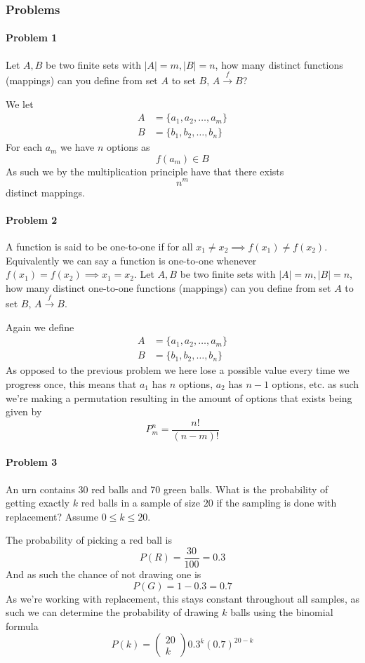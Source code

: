 \subsubsection{Problems}
\paragraph{Problem 1}
Let $A,B$ be two finite sets with $|A|=m,|B|=n$, how many distinct functions (mappings) can you define from set $A$ to set $B$, $A\xrightarrow{f} B$?

We let
\begin{align*}
    A&=\{a_{1},a_{2},\ldots,a_{m}\} \\
    B&=\{b_{1},b_{2},\ldots,b_{n}\}
\end{align*}
For each $a_{m}$ we have $n$ options as
\[
    f(a_{m})\in B
\]
As such we by the multiplication principle have that there exists
\[
    n^{m}
\]
distinct mappings.
\paragraph{Problem 2}
A function is said to be one-to-one if for all $x_{1}\neq x_{2}\implies f(x_{1})\neq f(x_{2})$. Equivalently we can say a function is one-to-one whenever $f(x_{1})=f(x_{2})\implies x_{1}=x_{2}$. Let $A,B$ be two finite sets with $|A|=m,|B|=n$, how many distinct one-to-one functions (mappings) can you define from set $A$ to set $B$, $A\xrightarrow{f} B$.

Again we define
\begin{align*}
    A&=\{a_{1},a_{2},\ldots,a_{m}\} \\
    B&=\{b_{1},b_{2},\ldots,b_{n}\}
\end{align*}
As opposed to the previous problem we here lose a possible value every time we progress once, this means that $a_{1}$ has $n$ options, $a_{2}$ has $n-1$ options, etc. as such we're making a permutation resulting in the amount of options that exists being given by
\[
    P_{m}^{n}=\frac{n!}{(n-m)!}
\]
\paragraph{Problem 3}
An urn contains 30 red balls and 70 green balls. What is the probability of getting exactly $k$ red balls in a sample of size $20$ if the sampling is done with replacement? Assume $0\leq k\leq 20$.

The probability of picking a red ball is 
\[
    P(R)=\frac{30}{100}=0.3
\]
And as such the chance of not drawing one is
\[
    P(G)=1-0.3=0.7
\]
As we're working with replacement, this stays constant throughout all samples, as such we can determine the probability of drawing $k$ balls using the binomial formula
\[
    P(k)=\begin{pmatrix}20\\k\end{pmatrix}0.3^{k}(0.7)^{20-k}
\]

